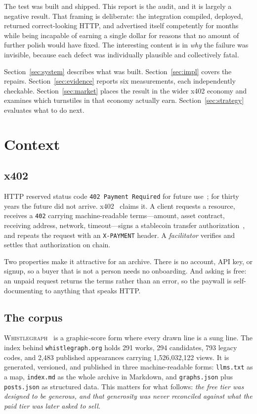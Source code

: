 \documentclass[10pt,letterpaper,twocolumn]{article}
\newcommand{\wg}{\textsc{Whistlegraph}}
\newcommand{\code}[1]{\texttt{#1}}
\begin{document}
The test was built and shipped. This report is the audit, and it is largely a
negative result. That framing is deliberate: the integration compiled,
deployed, returned correct-looking HTTP, and advertised itself competently for
months while being incapable of earning a single dollar for reasons that no
amount of further polish would have fixed. The interesting content is in
\emph{why} the failure was invisible, because each defect was individually
plausible and collectively fatal.

Section~\ref{sec:system} describes what was built. Section~\ref{sec:impl}
covers the repairs. Section~\ref{sec:evidence} reports six measurements,
each independently checkable. Section~\ref{sec:market} places the result in
the wider x402 economy and examines which turnstiles in that economy actually
earn. Section~\ref{sec:strategy} evaluates what to do next.

\section{Context}

\subsection{x402}

HTTP reserved status code \code{402 Payment Required} for future
use~\citep{rfc9110}; for thirty years the future did not
arrive. x402~\citep{x402spec} claims it. A client requests a resource, receives
a \code{402} carrying machine-readable terms---amount, asset contract,
receiving address, network, timeout---signs a stablecoin transfer
authorization~\citep{eip3009}, and repeats the request with an
\code{X-PAYMENT} header. A \emph{facilitator} verifies and settles that
authorization on chain.

Two properties make it attractive for an archive. There is no account,
API key, or signup, so a buyer that is not a person needs no onboarding. And
asking is free: an unpaid request returns the terms rather than an error, so
the paywall is self-documenting to anything that speaks HTTP.

\subsection{The corpus}

\wg{}~\citep{scudder2026whistlegraph} is a graphic-score form where every drawn
line is a sung line. The index behind \code{whistlegraph.org} holds 291 works,
294 candidates, 793 legacy codes, and 2{,}483 published appearances carrying
1{,}526{,}032{,}122 views. It is generated, versioned, and published in three
machine-readable forms: \code{llms.txt} as a map, \code{index.md} as the whole
archive in Markdown, and \code{graphs.json} plus \code{posts.json} as
structured data. This matters for what follows: \emph{the free tier was
designed to be generous, and that generosity was never reconciled against what
the paid tier was later asked to sell.}
\end{document}
